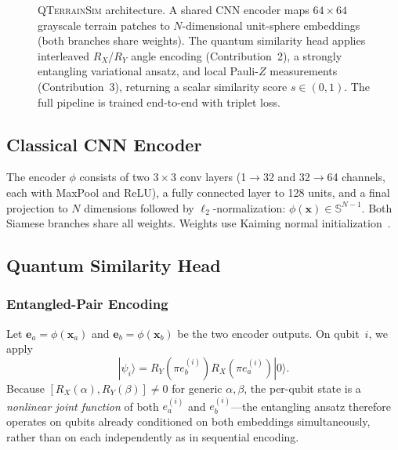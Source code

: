 \documentclass[conference,a4paper]{IEEEtran}
\newcommand{\qts}{\textsc{QTerrainSim}}
\newcommand{\RX}{R_X}
\newcommand{\RY}{R_Y}
\newcommand{\PauliZ}{Z}
\begin{document}
\begin{figure}[t]
  \caption{%
    \qts{} architecture.
    A shared CNN encoder maps $64{\times}64$ grayscale terrain patches to
    $N$-dimensional unit-sphere embeddings (both branches share weights).
    The quantum similarity head applies interleaved $\RX$/$\RY$ angle
    encoding (Contribution~2), a strongly entangling variational ansatz,
    and local Pauli-$\PauliZ$ measurements (Contribution~3),
    returning a scalar similarity score $s\in(0,1)$.
    The full pipeline is trained end-to-end with triplet loss.
  }
  \label{fig:architecture}
\end{figure}

\subsection{Classical CNN Encoder}
\label{sec:encoder}

The encoder $\phi$ consists of two $3{\times}3$ conv layers
(1$\to$32 and 32$\to$64 channels, each with MaxPool and ReLU),
a fully connected layer to 128 units, and a final projection to $N$
dimensions followed by $\ell_2$-normalization:
$\phi(\mathbf{x})\in\mathbb{S}^{N-1}$.
Both Siamese branches share all weights.
Weights use Kaiming normal initialization~\cite{he2015kaiming}.

\subsection{Quantum Similarity Head}
\label{sec:qhead}

\subsubsection{Entangled-Pair Encoding}
\label{sec:encoding}

Let $\mathbf{e}_a = \phi(\mathbf{x}_a)$ and
$\mathbf{e}_b = \phi(\mathbf{x}_b)$ be the two encoder outputs.
On qubit~$i$, we apply
\begin{equation}
  |\psi_i\rangle = \RY\!\left(\pi e_b^{(i)}\right)
                   \RX\!\left(\pi e_a^{(i)}\right)|0\rangle.
  \label{eq:encoding}
\end{equation}
Because $[\RX(\alpha), \RY(\beta)] \neq 0$ for generic $\alpha,\beta$,
the per-qubit state is a \emph{nonlinear joint function} of both
$e_a^{(i)}$ and $e_b^{(i)}$—the entangling ansatz therefore operates on
qubits already conditioned on both embeddings simultaneously, rather than
on each independently as in sequential encoding.
\end{document}
